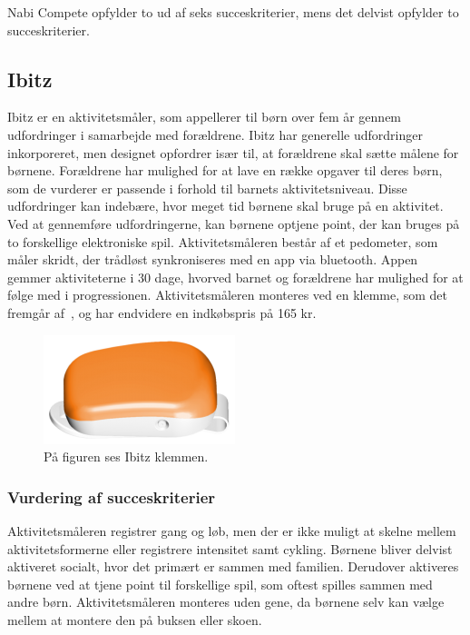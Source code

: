 Nabi Compete opfylder to ud af seks succeskriterier, mens det delvist opfylder to succeskriterier.

\subsection{Ibitz}
Ibitz er en aktivitetsmåler, som appellerer til børn over fem år gennem udfordringer i samarbejde med forældrene. Ibitz har generelle udfordringer inkorporeret, men designet opfordrer især til, at forældrene skal sætte målene for børnene. Forældrene har mulighed for at lave en række opgaver til deres børn, som de vurderer er passende i forhold til barnets aktivitetsniveau. \newline
Disse udfordringer kan indebære, hvor meget tid børnene skal bruge på en aktivitet. Ved at gennemføre udfordringerne, kan børnene optjene point, der kan bruges på to forskellige elektroniske spil. \newline
Aktivitetsmåleren består af et pedometer, som måler skridt, der trådløst synkroniseres med en app via bluetooth. Appen gemmer aktiviteterne i 30 dage, hvorved barnet og forældrene har mulighed for at følge med i progressionen. Aktivitetsmåleren monteres ved en klemme, som det fremgår af~, og har endvidere en indkøbspris på 165 kr. \citep{Ibitz_features2016}

\begin{figure}[H]
	\centering
	\includegraphics[scale=0.9]{figures/aProblemanalyse/ibitz.png}
	\caption{På figuren ses Ibitz klemmen.\citep{Ibitz_features2016}}
	\label{fig:ibitz}
\end{figure}

\subsubsection{Vurdering af succeskriterier}
Aktivitetsmåleren registrer gang og løb, men der er ikke muligt at skelne mellem aktivitetsformerne eller registrere intensitet samt cykling. Børnene bliver delvist aktiveret socialt, hvor det primært er sammen med familien. Derudover aktiveres børnene ved at tjene point til forskellige spil, som oftest spilles sammen med andre børn. Aktivitetsmåleren monteres uden gene, da børnene selv kan vælge mellem at montere den på buksen eller skoen.  

